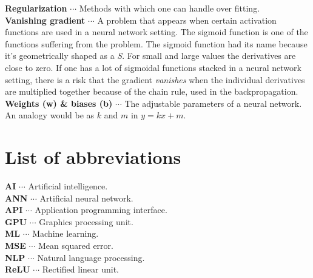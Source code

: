 \documentclass[11pt, letterpaper]{amsart}
\begin{document}
\noindent
\textbf{Regularization} $\cdots$ Methods with which one can handle over fitting.
\\

\noindent
\textbf{Vanishing gradient} $\cdots$ A problem that appears when certain activation functions are used in a neural network setting. The sigmoid function is one of the functions suffering from the problem. The sigmoid function had its name because it's geometrically shaped as a \textit{S}. For small and large values the derivatives are close to zero. If one has a lot of sigmoidal functions stacked in a neural network setting, there is a risk that the gradient \textit{vanishes} when the individual derivatives are multiplied together because of the chain rule, used in the backpropagation.
\\

\noindent
\textbf{Weights (w) \& biases (b)} $\cdots$ The adjustable parameters of a neural network. An analogy would be as $k$ and $m$ in $y = kx+m$.

\newpage

\section*{List of abbreviations}
\noindent
\textbf{AI} $\cdots$ Artificial intelligence.
\\

\noindent
\textbf{ANN} $\cdots$ Artificial neural network.
\\

\noindent
\textbf{API} $\cdots$ Application programming interface.
\\

\noindent
\textbf{GPU} $\cdots$ Graphics processing unit.
\\

\noindent
\textbf{ML} $\cdots$ Machine learning.
\\

\noindent
\textbf{MSE} $\cdots$ Mean squared error.
\\

\noindent
\textbf{NLP} $\cdots$ Natural language processing.
\\

\noindent
\textbf{ReLU} $\cdots$ Rectified linear unit.
\\




\newpage
\end{document}
